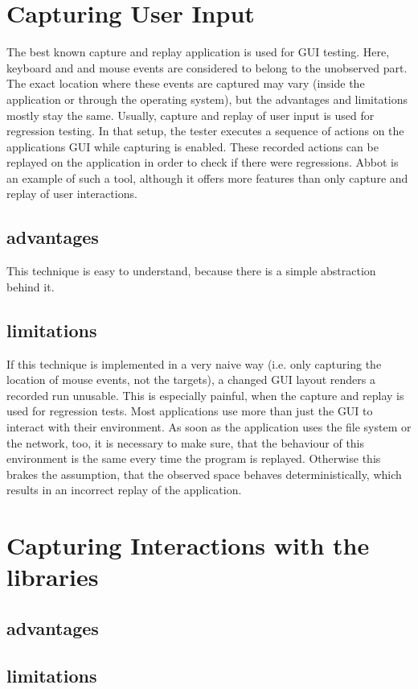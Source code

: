\section {Capturing User Input}
The best known capture and replay application is used for GUI testing. Here, keyboard and and mouse events are considered to belong to the unobserved part. The exact location where these events are captured may vary (inside the application or through the operating system), but the advantages and limitations mostly stay the same. Usually, capture and replay of user input is used for regression testing. In that setup, the tester executes a sequence of actions on the applications GUI while capturing is enabled. These recorded actions can be replayed on the application in order to check if there were regressions. Abbot \cite{abbot} is an example of such a tool, although it offers more features than only capture and replay of user interactions.
\subsection{advantages}
This technique is easy to understand, because there is a simple abstraction behind it. 
\subsection{limitations}
If this technique is implemented in a very naive way (i.e. only capturing the location of mouse events, not the targets), a changed GUI layout renders a recorded run unusable. This is especially painful, when the capture and replay is used for regression tests. Most applications use more than just the GUI to interact with their environment. As soon as the application uses the file system or the network, too, it is necessary to make sure, that the behaviour of this environment is the same every time the program is replayed. Otherwise this brakes the assumption, that the observed space behaves deterministically, which results in an incorrect replay of the application.
\section {Capturing Interactions with the libraries}



\subsection{advantages}
\subsection{limitations}
